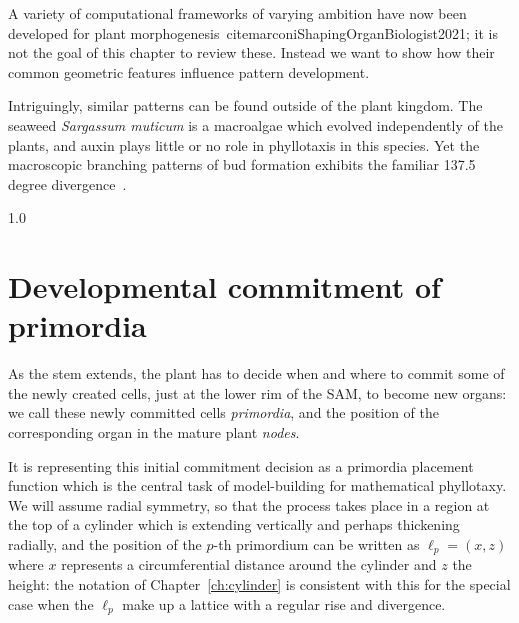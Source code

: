 A variety of computational frameworks of varying ambition have now been developed for plant morphogenesis~cite{marconiShapingOrganBiologist2021}; it is not the goal of this chapter to review these. Instead we want to show how their common geometric features influence pattern development. 

Intriguingly, similar  patterns can be found outside of the plant kingdom. The seaweed \textit{Sargassum muticum} is a macroalgae which evolved independently of the plants, and auxin plays little or no role in phyllotaxis in this species. Yet the macroscopic branching patterns of bud formation exhibits the familiar 137.5 degree divergence~\cite{linardicUnderstandingSpiralPatterning2017}. 

%
{1.0}





\section{Developmental commitment of primordia}


As the stem extends, the plant has to decide when and where to commit some of the newly created cells, just at the lower rim of the SAM, to become new organs: we call these newly committed cells \textit{primordia}, and the position of the corresponding organ in the mature plant \textit{nodes}. 

It is representing this initial commitment decision as a primordia placement function which is the central task of model-building for mathematical phyllotaxy. We will assume radial symmetry, so that the process takes place in a region at the top of a cylinder which is extending vertically and perhaps thickening radially, and the position of the $p$-th primordium can be written as $\ell_p=(x,z)$ where $x$ represents a circumferential distance around the cylinder and $z$ the height: the notation of Chapter~\ref{ch:cylinder} is consistent with this for the special case when the $\ell_p$ make up a lattice with a regular rise and divergence. 

